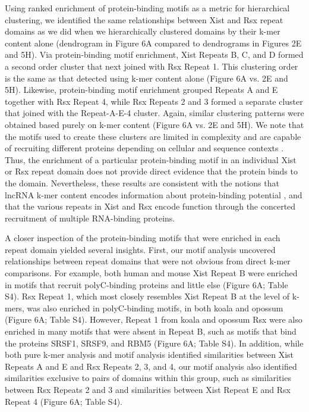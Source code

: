 Using ranked enrichment of protein-binding motifs as a metric for hierarchical clustering, we  identified the same relationships between Xist and Rsx repeat domains as we did when we hierarchically clustered domains by their k-mer content alone (dendrogram in Figure 6A compared to dendrograms in Figures 2E and 5H). Via protein-binding motif enrichment, Xist Repeats B, C, and D formed a second order cluster that next joined with Rsx Repeat 1.  This clustering order is the same as that detected using k-mer content alone (Figure 6A vs. 2E and 5H). Likewise, protein-binding motif enrichment grouped Repeats A and E together with Rsx Repeat 4, while Rsx Repeats 2 and 3 formed a separate cluster that joined with the Repeat-A-E-4 cluster. Again, similar clustering patterns were obtained based purely on k-mer content (Figure 6A vs. 2E and 5H). We note that the motifs used to create these clusters are limited in complexity and are capable of recruiting different proteins depending on cellular and sequence contexts \cite{Dominguez2018SequenceProteins,Ray2013ARegulation}. Thus, the enrichment of a particular protein-binding motif in an individual Xist or Rsx repeat domain does not provide direct evidence that the protein binds to the domain. Nevertheless, these results are consistent with the notions that lncRNA k-mer content encodes information about protein-binding potential \cite{Kirk2018FunctionalContent}, and that the various repeats in Xist and Rsx encode function through the concerted recruitment of multiple RNA-binding proteins.

A closer inspection of the protein-binding motifs that were enriched in each repeat domain yielded several insights. First, our motif analysis uncovered relationships between repeat domains that were not obvious from direct k-mer comparisons. For example, both human and mouse Xist Repeat B were enriched in motifs that recruit polyC-binding proteins and little else (Figure 6A; Table S4). Rsx Repeat 1, which most closely resembles Xist Repeat B at the level of k-mers, was also enriched in polyC-binding motifs, in both koala and opossum (Figure 6A; Table S4). However, Repeat 1 from koala and opossum Rsx were also enriched in many motifs that were absent in Repeat B, such as motifs that bind the proteins SRSF1, SRSF9, and RBM5 (Figure 6A; Table S4). In addition, while both pure k-mer analysis and motif analysis identified similarities between Xist Repeats A and E and Rsx Repeats 2, 3, and 4, our motif analysis also identified similarities exclusive to pairs of domains within this group, such as similarities between Rsx Repeats 2 and 3 and similarities between Xist Repeat E and Rsx Repeat 4 (Figure 6A; Table S4). 

